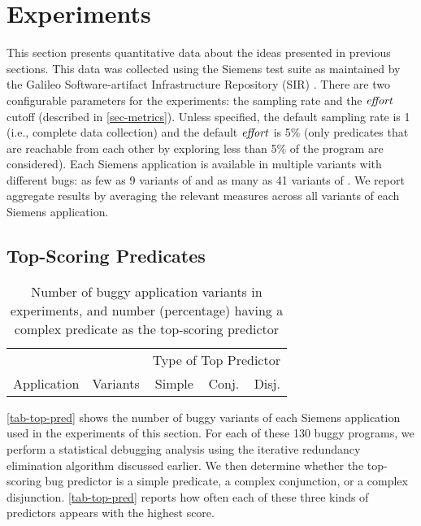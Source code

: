 
\section{Experiments}
\label{sec-experiments}

This section presents quantitative data about the ideas presented in previous sections.  This data was collected using the Siemens test suite \cite{257766} as maintained by the Galileo Software-artifact Infrastructure Repository (SIR) \cite{Do05,SAI}.  There are two configurable parameters for the experiments: the sampling rate and the $\mathit{effort}$ cutoff (described in \autoref{sec-metrics}).  Unless specified, the default sampling rate is 1 (i.e., complete data collection) and the default $\mathit{effort}$ is 5\% (only predicates that are reachable from each other by exploring less than 5\% of the program are considered).  Each Siemens application is available in multiple variants with different bugs: as few as 9 variants of  and as many as 41 variants of .  We report aggregate results by averaging the relevant measures across all variants of each Siemens application.

\subsection{Top-Scoring Predicates}

\begin{table}[tb]
  \centering
  \newlength{\percentwidth}
  \settowidth{\percentwidth}{\%}
  \newcommand{\countcell}[1]{#1\hspace{\percentwidth}}
  \begin{tabular}{lrrrr}
    \toprule
    & & \multicolumn{3}{c}{Type of Top Predictor} \\
    \cmidrule{3-5}
    Application & Variants & Simple & Conj. & Disj. \\
    \midrule
    
    \bottomrule
  \end{tabular}
  \caption{Number of buggy application variants in experiments, and
    number (percentage) having a complex predicate as the top-scoring
    predictor}
  \label{tab-top-pred}
\end{table}

\autoref{tab-top-pred} shows the number of buggy variants of each Siemens application used in the experiments of this section.  For each of these 130 buggy programs, we perform a statistical debugging analysis using the iterative redundancy elimination algorithm discussed earlier.  We then determine whether the top-scoring bug predictor is a simple predicate, a complex conjunction, or a complex disjunction.  \autoref{tab-top-pred} reports how often each of these three kinds of predictors appears with the highest score.


